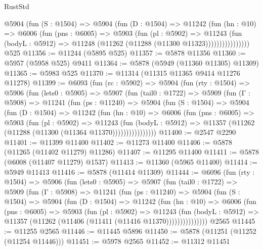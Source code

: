 \begin{lexlean}{RustStd}
\begin{coremodule}
                @5904
                  (fun (S : @1504) =>
                  @5904
                    (fun (D : @1504) =>
                    @11242
                      (fun (hn : @10) =>
                      @6006
                        (fun (pns : @6005) =>
                        @5903
                          (fun (pl : @5902) =>
                          @11243
                            (fun (bodyL : @5912) =>
                            @11248 (@11262 (@11288 (@11300 @11323))))))))))))))))
    @525
@11356 := @11244 (@5895 @525)
@11357 := @5878 @11356
@11360 := @5957 (@5958 @525) @9411
@11364 := @5878 (@5949 (@11360 @11305) @11309)
@11365 := @5983 @525
@11370 := @11314 (@11315 @11365 @9414 @11276 @11278)
@11399 := @6093
    (fun (rc : @5902) =>
    @5904
      (fun (rty : @1504) =>
      @5906
        (fun (lets0 : @5905) =>
        @5907
          (fun (tail0 : @1722) =>
          @5909
            (fun (Γ : @5908) =>
            @11241
              (fun (ps : @11240) =>
              @5904
                (fun (S : @1504) =>
                @5904
                  (fun (D : @1504) =>
                  @11242
                    (fun (hn : @10) =>
                    @6006
                      (fun (pns : @6005) =>
                      @5903
                        (fun (pl : @5902) =>
                        @11243
                          (fun (bodyL : @5912) =>
                          @11357 (@11262 (@11288 (@11300 (@11364 @11370))))))))))))))))
@11400 := @2547 @2290
@11401 := @11399 @11400
@11402 := @11273 @11400
@11406 := @5878 (@11265 (@11402 @11279) @11286)
@11407 := @11295 @11400
@11411 := @5878 (@6008 (@11407 @11279) @1537)
@11413 := @11360 (@5965 @11400)
@11414 := @5949 @11413
@11416 := @5878 (@11414 @11309)
@11444 := @6096
    (fun (rty : @1504) =>
    @5906
      (fun (lets0 : @5905) =>
      @5907
        (fun (tail0 : @1722) =>
        @5909
          (fun (Γ : @5908) =>
          @11241
            (fun (ps : @11240) =>
            @5904
              (fun (S : @1504) =>
              @5904
                (fun (D : @1504) =>
                @11242
                  (fun (hn : @10) =>
                  @6006
                    (fun (pns : @6005) =>
                    @5903
                      (fun (pl : @5902) =>
                      @11243
                        (fun (bodyL : @5912) =>
                        @11357 (@11262 (@11406 (@11411 (@11416 @11370)))))))))))))))
    @2565
@11445 := @11255 @2565
@11446 := @11445 @5896
@11450 := @5878 (@11251 (@11252 (@11254 @11446)))
@11451 := @5978 @2565
@11452 := @11312 @11451

\end{coremodule}
\end{lexlean}
